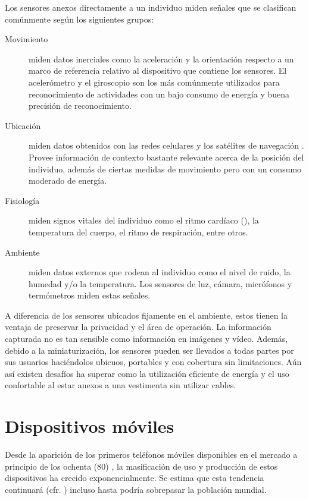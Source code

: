 Los sensores anexos directamente a un individuo miden señales que
se clasifican comúnmente según los siguientes grupos\cite{LaraLabrador2013}:
\begin{description}
\item [{Movimiento}] miden datos inerciales como la aceleración y la orientación
respecto a un marco de referencia relativo al dispositivo que contiene
los sensores. El acelerómetro y el giroscopio son los más comúnmente
utilizados para reconocimiento de actividades con un bajo consumo
de energía y buena precisión de reconocimiento\cite{Bao2004,LaraLabrador2012}.
\item [{Ubicación}] miden datos obtenidos con las redes celulares 
y los satélites de navegación . Provee información de contexto
bastante relevante acerca de la posición del individuo, además de
ciertas medidas de movimiento pero con un consumo moderado de energía.
\item [{Fisiología}] miden signos vitales del individuo como el ritmo cardíaco
(), la temperatura del cuerpo, el ritmo de respiración,
entre otros.
\item [{Ambiente}] miden datos externos que rodean al individuo como el
nivel de ruido, la humedad y/o la temperatura. Los sensores de luz,
cámara, micrófonos y termómetros miden estas señales. 
\end{description}
A diferencia de los sensores ubicados fijamente en el ambiente, estos
tienen la ventaja de preservar la privacidad y el área de operación.
La información capturada no es tan sensible como información en imágenes
y vídeo. Además, debido a la miniaturización, los sensores pueden
ser llevados a todas partes por sus usuarios haciéndolos ubicuos,
portables y con cobertura sin limitaciones. Aún así existen desafíos
ha superar como la utilización eficiente de energía y el uso confortable
al estar anexos a una vestimenta sin utilizar cables.

\section{Dispositivos móviles}

\label{sec24:dispositivos-moviles} Desde la aparición de los primeros
teléfonos móviles disponibles en el mercado a principio de los ochenta
(80) \cite{Tanenbaum2010}, la masificación de uso y producción de
estos dispositivos ha crecido exponencialmente. Se estima que esta
tendencia continuará (cfr. \cite{Ekholm2011}) incluso hasta podría
sobrepasar la población mundial.


